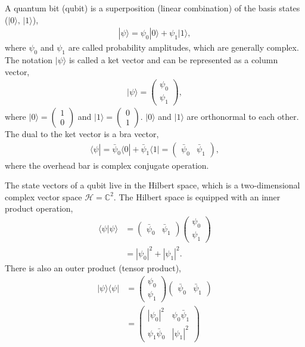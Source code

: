 \documentclass{beamer}
\begin{document}
\begin{frame}
\justify
A quantum bit (qubit) is a superposition (linear combination) of the basis states ($|0\rangle,\, |1\rangle$),
\begin{align}
|\psi\rangle = \psi_0 |0\rangle + \psi_1 |1\rangle,
\end{align}
where $\psi_0$ and $\psi_1$ are called probability amplitudes, which are generally complex. The notation $|\psi\rangle$ is called a ket vector and can be represented as a column vector,
\begin{align}
|\psi\rangle = \begin{pmatrix} \psi_0 \\ \psi_1 \end{pmatrix},
\end{align}
where $|0\rangle = \begin{pmatrix} 1 \\ 0 \end{pmatrix}$ and $|1\rangle = \begin{pmatrix} 0 \\ 1 \end{pmatrix}$. $|0\rangle$ and $|1\rangle$ are orthonormal to each other.
\vfill
The dual to the ket vector is a bra vector,
\begin{align}
\langle\psi| = \bar{\psi}_0 \langle 0| + \bar{\psi}_1 \langle 1| = \begin{pmatrix} \bar{\psi}_0 & \bar{\psi}_1 \end{pmatrix},
\end{align}
where the overhead bar is complex conjugate operation.
\end{frame}

\begin{frame}
\justify
The state vectors of a qubit live in the Hilbert space, which is a two-dimensional complex vector space $\mathcal{H} = \mathbb{C}^2$. The Hilbert space is equipped with an inner product operation,
\begin{align}
\langle\psi|\psi\rangle & = \begin{pmatrix} \bar{\psi}_0 & \bar{\psi}_1 \end{pmatrix} \begin{pmatrix} \psi_0 \\ \psi_1 \end{pmatrix} \nonumber \\
& = |\psi_0|^2 + |\psi_1|^2.
\end{align}
\vfill
There is also an outer product (tensor product),
\begin{align}
|\psi\rangle \langle\psi| & = \begin{pmatrix} \psi_0 \\ \psi_1 \end{pmatrix} \begin{pmatrix} \bar{\psi}_0 & \bar{\psi}_1 \end{pmatrix} \nonumber \\
& = \begin{pmatrix} |\psi_0|^2 & \psi_0 \bar{\psi}_1 \\ \psi_1 \bar{\psi}_0 & |\psi_1|^2 \end{pmatrix} \label{densitymatrix}
\end{align}
\end{frame}
\end{document}
